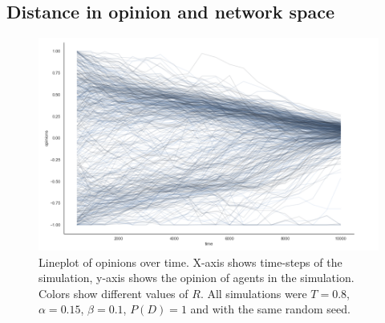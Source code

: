 \documentclass{article}
\begin{document}
\subsection{Distance in opinion and network space}
\begin{figure}[H]
    \centering
    \includegraphics[width=.8\linewidth]{../plots/example/Lineplot_Over_Time.png}
  \caption{Lineplot of opinions over time. X-axis shows time-steps of the simulation, y-axis shows the opinion of agents in the simulation. Colors show different values of $R$. All simulations were $T = 0.8$, $\alpha = 0.15$, $\beta = 0.1$, $P(D) = 1$ and with the same random seed.}
  \label{fig:sfig1}
\end{figure}
\end{document}
